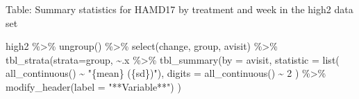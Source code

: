 \documentclass[
  letterpaper,
  DIV=11,
  numbers=noendperiod]{scrreprt}
\newenvironment{Shaded}{\begin{snugshade}}{\end{snugshade}}
\newcommand{\AttributeTok}[1]{\textcolor[rgb]{0.40,0.45,0.13}{#1}}
\newcommand{\DecValTok}[1]{\textcolor[rgb]{0.68,0.00,0.00}{#1}}
\newcommand{\FunctionTok}[1]{\textcolor[rgb]{0.28,0.35,0.67}{#1}}
\newcommand{\NormalTok}[1]{\textcolor[rgb]{0.00,0.23,0.31}{#1}}
\newcommand{\SpecialCharTok}[1]{\textcolor[rgb]{0.37,0.37,0.37}{#1}}
\newcommand{\StringTok}[1]{\textcolor[rgb]{0.13,0.47,0.30}{#1}}
\begin{document}
Table: Summary statistics for HAMD17 by treatment and week in the high2
data set

\begin{Shaded}
\begin{Highlighting}[]
\NormalTok{high2 }\SpecialCharTok{\%\textgreater{}\%} \FunctionTok{ungroup}\NormalTok{() }\SpecialCharTok{\%\textgreater{}\%}
  \FunctionTok{select}\NormalTok{(change, group, avisit) }\SpecialCharTok{\%\textgreater{}\%}
  \FunctionTok{tbl\_strata}\NormalTok{(}\AttributeTok{strata=}\NormalTok{group, }
             \SpecialCharTok{\textasciitilde{}}\NormalTok{.x }\SpecialCharTok{\%\textgreater{}\%} 
               \FunctionTok{tbl\_summary}\NormalTok{(}\AttributeTok{by =}\NormalTok{ avisit,}
                           \AttributeTok{statistic =} \FunctionTok{list}\NormalTok{(}
                             \FunctionTok{all\_continuous}\NormalTok{() }\SpecialCharTok{\textasciitilde{}} \StringTok{"\{mean\} (\{sd\})"}\NormalTok{), }
                           \AttributeTok{digits =} \FunctionTok{all\_continuous}\NormalTok{() }\SpecialCharTok{\textasciitilde{}} \DecValTok{2}\NormalTok{ ) }\SpecialCharTok{\%\textgreater{}\%}
                \FunctionTok{modify\_header}\NormalTok{(}\AttributeTok{label =} \StringTok{"**Variable**"}\NormalTok{)}
\NormalTok{  )}
\end{Highlighting}
\end{Shaded}
\end{document}
